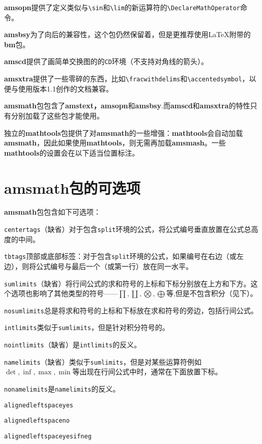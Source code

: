 \documentclass[openany]{ctexbook}
\begin{document}
{\bfseries amsopn}提供了定义类似与\verb|\sin|和\verb|\lim|的新运算符的\verb|\DeclareMathOperator|命令。

{\bfseries amsbsy}为了向后的兼容性，这个包仍然保留着，但是更推荐使用\LaTeX 附带的{\bfseries bm}包。

{\bfseries amscd}提供了画简单交换图的的\verb|CD|环境（不支持对角线的箭头）。

{\bfseries amsxtra}提供了一些零碎的东西，比如\verb|\fracwithdelims|和\verb|\accentedsymbol|，以便与使用版本1.1创作的文档兼容。

{\bfseries amsmath}包包含了{\bfseries amstext，amsopn}和{\bfseries amsbsy}.而{\bfseries amscd}和{\bfseries amsxtra}的特性只有分别加载了这些包才能使用。


独立的{\bfseries mathtools}包\cite{10}提供了对{\bfseries amsmath}的一些增强：{\bfseries mathtools}会自动加载{\bfseries amsmath}，因此如果使用{\bfseries mathtools}，则无需再加载{\bfseries amsmash}。一些{\bfseries mathtools}的设置会在以下适当位置标注。

\chapter{{\bfseries amsmath}包的可选项}
{\bfseries amsmath}包包含如下可选项：

\verb|centertags|（缺省）对于包含\verb|split|环境的公式，将公式编号垂直放置在公式总高度的中间。

\verb|tbtags|顶部或底部标签：对于包含\verb|split|环境的公式，如果编号在右边（或左边），则将公式编号与最后一个（或第一行）放在同一水平。

\verb|sumlimits|（缺省）将行间公式的求和符号的上标和下标分别放在上方和下方。这个选项也影响了其他类型的符号——$\displaystyle{\prod,\coprod,\bigotimes,\bigoplus}$等,但是不包含积分（见下）。

\verb|nosumlimits|总是将求和符号的上标和下标放在求和符号的旁边，包括行间公式。

\verb|intlimits|类似于\verb|sumlimits|，但是针对积分符号的。

\verb|nointlimits|（缺省）是\verb|intlimits|的反义。

\verb|namelimits|（缺省）类似于\verb|sumlimits|，但是对某些运算符例如$\det,\inf,\max,\min$等出现在行间公式中时，通常在下面放置下标。

\verb|nonamelimits|是\verb|namelimits|的反义。

\verb|alignedleftspaceyes|

\verb|alignedleftspaceno|

\verb|alignedleftspaceyesifneg|
\end{document}
